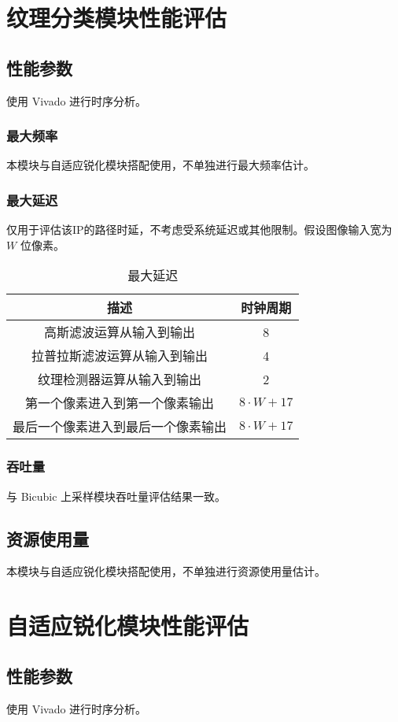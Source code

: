 \documentclass[12pt, a4paper, oneside]{ctexbook}
\begin{document}
	\chapter{纹理分类模块性能评估}
	\section{性能参数}
	使用 Vivado 进行时序分析。
		\subsection{最大频率}
		本模块与自适应锐化模块搭配使用，不单独进行最大频率估计。
		\subsection{最大延迟}
		仅用于评估该IP的路径时延，不考虑受系统延迟或其他限制。假设图像输入宽为 $W$ 位像素。
		\begin{table}[h]
			\centering
			\begin{tabular}{|c|c|}
				\hline
				\textbf{描述}       & \textbf{时钟周期}   \\ \hline
				高斯滤波运算从输入到输出      & 8               \\ \hline
				拉普拉斯滤波运算从输入到输出    & 4               \\ \hline
				纹理检测器运算从输入到输出     & 2               \\ \hline
				第一个像素进入到第一个像素输出   & $8\cdot W+17$   \\ \hline
				最后一个像素进入到最后一个像素输出 & $8\cdot W + 17$ \\ \hline
			\end{tabular}
		\caption{最大延迟}
		\end{table}
		\subsection{吞吐量}
		与 Bicubic 上采样模块吞吐量评估结果一致。
	\section{资源使用量}
	本模块与自适应锐化模块搭配使用，不单独进行资源使用量估计。
	
	
	\chapter{自适应锐化模块性能评估}
	\section{性能参数}
	使用 Vivado 进行时序分析。
\end{document}
